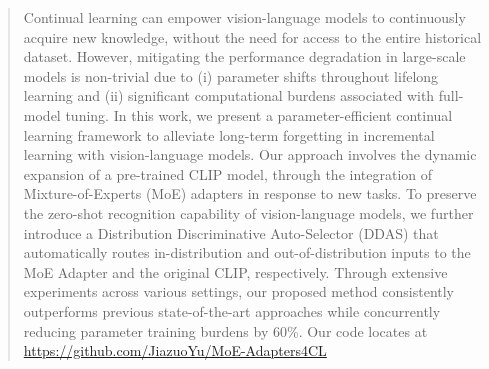 \begin{abstract}
%
Continual learning can empower vision-language models to continuously acquire new knowledge, without the need for access to the entire historical dataset. However, mitigating the performance degradation in large-scale models is non-trivial due to (i) parameter shifts throughout lifelong learning and (ii) significant computational burdens associated with full-model tuning. In this work, we present a parameter-efficient continual learning framework to alleviate long-term forgetting in incremental learning with vision-language models. Our approach involves the dynamic expansion of a pre-trained CLIP model, through the integration of Mixture-of-Experts (MoE) adapters in response to new tasks. To preserve the zero-shot recognition capability of vision-language models, we further introduce a Distribution Discriminative Auto-Selector (DDAS) that automatically routes in-distribution and out-of-distribution inputs to the MoE Adapter and the original CLIP, respectively. Through extensive experiments across various settings, our proposed method consistently outperforms previous state-of-the-art approaches while concurrently reducing parameter training burdens by 60\%. Our code locates at \url{https://github.com/JiazuoYu/MoE-Adapters4CL}
\end{abstract}
